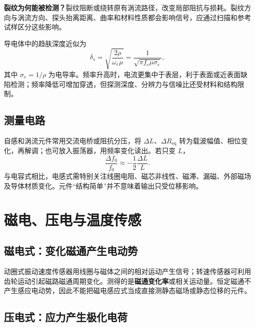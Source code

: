 \textbf{裂纹为何能被检测？}裂纹阻断或绕转原有涡流路径，改变局部阻抗与损耗。裂纹方向与涡流方向、探头抬离距离、曲率和材料性质都会影响信号，应通过扫描和参考试样区分这些影响。

导电体中的趋肤深度近似为
\[
\delta_s=\sqrt{\frac{2\rho}{\omega_e\mu}}
=\frac{1}{\sqrt{\pi f_e\mu\sigma_e}},
\]
其中 $\sigma_e=1/\rho$ 为电导率。频率升高时，电流更集中于表层，利于表面或近表面缺陷检测；频率降低可增加穿透，但探测深度、分辨力与信噪比还受材料和结构限制。


\subsection{测量电路}
自感和涡流元件常用交流电桥或阻抗分压，将 $\Delta L$、$\Delta R_{\mathrm{eq}}$ 转为载波幅值、相位变化，再解调；也可放入振荡器，用频率变化读出。若只变 $L$，
\[
\frac{\Delta f_0}{f_0}\approx-\frac12\frac{\Delta L}{L}.
\]
与电容式相比，电感式需特别关注线圈电阻、磁芯非线性、磁滞、漏磁、外部磁场及导体材质变化。元件“结构简单”并不意味着输出只受位移影响。

\Needspace{5cm}
\section{磁电、压电与温度传感}
\label{sec:ch4-generating}
\subsection{磁电式：变化磁通产生电动势}

动圈式振动速度传感器用线圈与磁体之间的相对运动产生信号；转速传感器可利用齿轮运动引起磁路磁通周期变化。测得的是\textbf{磁通变化率}或相关运动量。恒定磁通不产生感应电动势，因此不能把磁电感应式当成直接测静态磁场或静态位移的元件。

\subsection{压电式：应力产生极化电荷}

